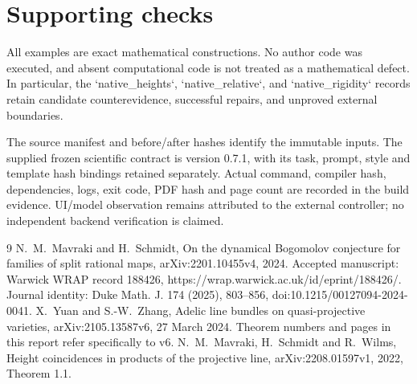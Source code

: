 \documentclass[10pt]{article}
\begin{document}
\section*{Supporting checks}
All examples are exact mathematical constructions. No author code was executed, and absent computational code is not treated as a mathematical defect. In particular, the `native\_heights`, `native\_relative`, and `native\_rigidity` records retain candidate counterevidence, successful repairs, and unproved external boundaries.\par
The source manifest and before/after hashes identify the immutable inputs. The supplied frozen scientific contract is version 0.7.1, with its task, prompt, style and template hash bindings retained separately. Actual command, compiler hash, dependencies, logs, exit code, PDF hash and page count are recorded in the build evidence. UI/model observation remains attributed to the external controller; no independent backend verification is claimed.\par
9 N. M. Mavraki and H. Schmidt, On the dynamical Bogomolov conjecture for families of split rational maps, arXiv:2201.10455v4, 2024. Accepted manuscript: Warwick WRAP record 188426, https://wrap.warwick.ac.uk/id/eprint/188426/. Journal identity: Duke Math. J. 174 (2025), 803–856, doi:10.1215/00127094-2024-0041. X. Yuan and S.-W. Zhang, Adelic line bundles on quasi-projective varieties, arXiv:2105.13587v6, 27 March 2024. Theorem numbers and pages in this report refer specifically to v6. N. M. Mavraki, H. Schmidt and R. Wilms, Height coincidences in products of the projective line, arXiv:2208.01597v1, 2022, Theorem 1.1.\par
\end{document}

